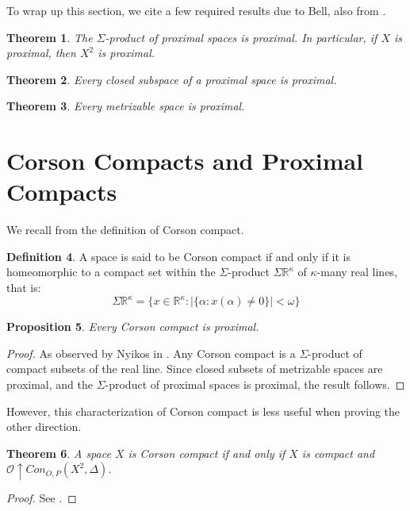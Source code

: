 \documentclass{amsart}
\newtheorem{thm}{Theorem}[section]
\newtheorem{prop}[thm]{Proposition}
\theoremstyle{definition}
\newtheorem{defn}[thm]{Definition}
\theoremstyle{remark}
\newcommand{\<}{\langle}
\renewcommand{\>}{\rangle}
\newcommand{\congame}[2]{Con_{O,P}(#1,#2)}
\newcommand{\pl}[1]{\mathscr{#1}}
\newcommand{\win}{\uparrow}
\begin{document}
To wrap up this section, we cite a few required results due to Bell, also from \cite{b}.

\begin{thm}
  The $\Sigma$-product of proximal spaces is proximal. In particular, if $X$ is proximal, then $X^2$ is proximal.
\end{thm}

\begin{thm}
  Every closed subspace of a proximal space is proximal.
\end{thm}

\begin{thm}
  Every metrizable space is proximal.
\end{thm}

\section{Corson Compacts and Proximal Compacts}

We recall from \cite{gcovering} the definition of Corson compact.

\begin{defn}
  A space is said to be Corson compact if and only if it is homeomorphic to a compact set within the $\Sigma$-product $\Sigma\mathbb{R}^\kappa$ of $\kappa$-many real lines, that is:
    \[
      \Sigma\mathbb{R}^\kappa
        =
      \{x\in \mathbb{R}^\kappa: |\{\alpha:x(\alpha)\not=0\}|<\omega\}
    \]
\end{defn}

\begin{prop}
  Every Corson compact is proximal.
\end{prop}

\begin{proof}
  As observed by Nyikos in \cite{nproximal}. Any Corson compact is a $\Sigma$-product of compact subsets of the real line. Since closed subsets of metrizable spaces are proximal, and the $\Sigma$-product of proximal spaces is proximal, the result follows.
\end{proof}

However, this characterization of Corson compact is less useful when proving the other direction.

\begin{thm}
  A space $X$ is Corson compact if and only if $X$ is compact and $\pl O\win\congame{X^2}{\Delta}$.
\end{thm}

\begin{proof}
  See \cite{gcovering}.
\end{proof}
\end{document}
